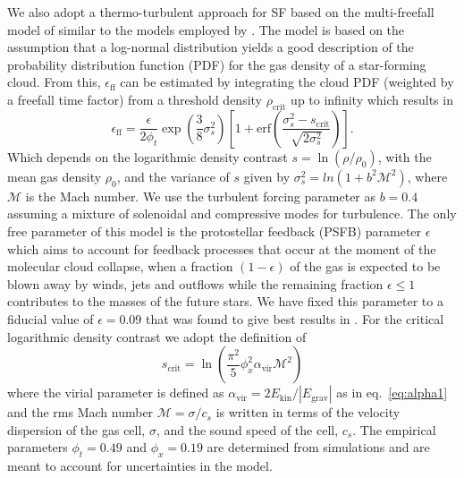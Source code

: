 \documentclass{aa}
\begin{document}
We also adopt a thermo-turbulent approach for SF based on the multi-freefall model of \cite{Federrath2012} similar to the models employed by \citet{Kimm2017,Trebitsch2017,Trebitsch2018,Kretschmer2020}. The \citet{Federrath2012} model is based on the assumption that a log-normal distribution yields a good description of the probability distribution function (PDF) for the gas density of a star-forming cloud. From this, $\epsilon_{\mathrm{ff}}$ can be estimated by integrating the cloud PDF (weighted by a freefall time factor) from a threshold density $\rho_{\mathrm{crit}}$ up to infinity which results in
\begin{equation}\label{eq:efficiency}
\epsilon_{\mathrm{ff}} = \frac{\epsilon}{2\phi_t}
\exp\left(\frac{3}{8} \sigma_s^2 \right)
\left[
 1 + \mathrm{erf}\left( \frac{\sigma_s^2 - s_{\mathrm{crit}}}{\sqrt{2\sigma_s^2}}\right)\right].
\end{equation}
Which depends on the logarithmic density contrast $s = \ln (\rho/\rho_0)$, with the mean gas density $\rho_0$, and the variance of $s$ given by $\sigma_s^2 = ln(1+b^2\mathcal{M}^2)$, where $\mathcal{M}$ is the Mach number. We use the turbulent forcing parameter as $b=0.4$ assuming a mixture of solenoidal and compressive modes for turbulence. The only free parameter of this model is the protostellar feedback (PSFB) parameter $\epsilon$ \cite{Schmidt2011} which aims to account for feedback processes that occur at the moment of the molecular cloud collapse, when a fraction $(1-\epsilon)$ of the gas is expected to be blown away by winds, jets and outflows \citep{Wardle1993,Konigl2000,Pudritz2007,Peters2011,Seifried2011,Federrath2012} while the remaining fraction $\epsilon\leq 1$ contributes to the masses of the future stars. We have fixed this parameter to a fiducial value of $\epsilon = 0.09$ that was found to give best results in \cite{Nunez2021}. For the critical logarithmic density contrast we adopt the definition of \cite{krumholz2005general} 
\begin{equation}
s_{\mathrm{crit}} = \ln\left( \frac{\pi^2}{5}\phi_x^2 \alpha_{\mathrm{vir}}
\mathcal{M}^2 
\right) 
\end{equation}
where the virial parameter is defined as $\alpha_{\mathrm{vir}}=2E_{\mathrm{kin}}/|E_{\mathrm{grav}}|$ as in eq.~\ref{eq:alpha1} and the rms Mach number $\mathcal{M}=\sigma/c_s$ is written in terms of the velocity dispersion of the gas cell, $\sigma$, and the sound speed of the cell, $c_s$. The empirical parameters $\phi_t = 0.49$ and $\phi_x = 0.19$ are determined from simulations and are meant to account for uncertainties in the model.
\end{document}
